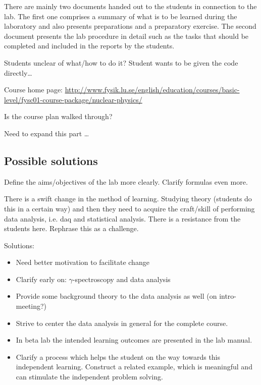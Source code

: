 \documentclass[]{article}
\begin{document}
There are mainly two documents handed out to the students in connection to the lab.
The first one comprises a summary of what is to be learned during the laboratory and also presents preparations and a preparatory exercise.
The second document presents the lab procedure in detail such as the tasks that should be completed and included in the reports by the students.

Students unclear of what/how to do it? Student wants to be given the code directly\dots

Course home page: \url{http://www.fysik.lu.se/english/education/courses/basic-level/fysc01-course-package/nuclear-physics/}

Is the course plan walked through?

Need to expand this part \dots


\subsection{Possible solutions}
Define the aims/objectives of the lab more clearly. Clarify formulas even more.

There is a swift change in the method of learning.
Studying theory (students do this in a certain way) and then they need to acquire the craft/skill of performing data analysis, i.e. daq and statistical analysis.
There is a resistance from the students here.
Rephrase this as a challenge.

Solutions:
\begin{itemize}
  \item Need better motivation to facilitate change
  \item Clarify early on: $\gamma$-spectroscopy and data analysis
  \item Provide some background theory to the data analysis as well (on intro-meeting?)
  \item Strive to center the data analysis in general for the complete course.
  \item In beta lab the intended learning outcomes are presented in the lab manual.
  \item Clarify a process which helps the student on the way towards this independent learning. Construct a related example, which is meaningful and can stimulate the independent problem solving.
\end{itemize}
\end{document}
